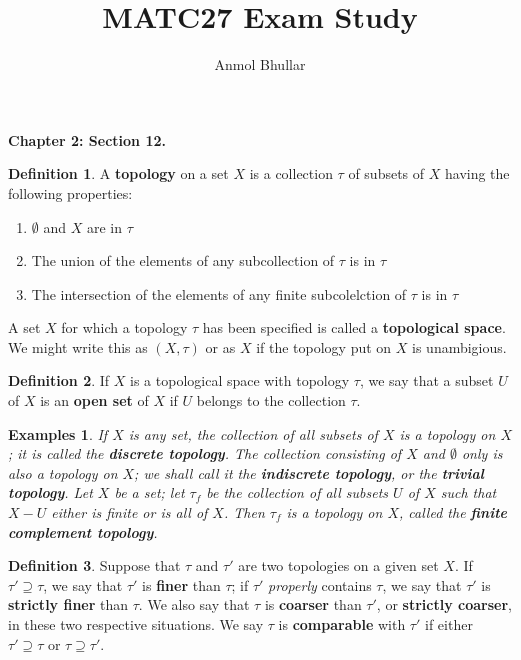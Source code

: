 \documentclass{article}
\title{MATC27 Exam Study}
\author{Anmol Bhullar}
\newtheorem{es}{Examples}
\theoremstyle{definition}
\newtheorem{definition}{Definition}[section]
\theoremstyle{remark}
\begin{document}
    \maketitle

    \textbf{Chapter 2: Section 12.}
    \begin{definition}
        A \textbf{topology} on a set $X$ is a collection $\tau$ of subsets of $X$ having the following properties:
        \begin{enumerate}
            \item $\emptyset$ and $X$ are in $\tau$
            \item The union of the elements of any subcollection of $\tau$ is in $\tau$
            \item The intersection of the elements of any finite subcolelction of $\tau$ is in $\tau$
        \end{enumerate}
        A set $X$ for which a topology $\tau$ has been specified is called a \textbf{topological space}. We might write this
        as $(X,\tau)$ or as $X$ if the topology put on $X$ is unambigious.
    \end{definition}

    \begin{definition}
        If $X$ is a topological space with topology $\tau$, we say that a subset $U$ of $X$ is an \textbf{open set} of $X$ if $U$
        belongs to the collection $\tau$.
    \end{definition}

    \begin{es}
        If $X$ is any set, the collection of \textit{all} subsets of $X$ is a topology on $X$; it is called the \textbf{discrete
            topology}. The collection consisting of $X$ and $\emptyset$ only is also a topology on $X$; we shall call it the
        \textbf{indiscrete topology}, or the \textbf{trivial topology}. Let $X$ be a set; let $\tau_f$ be the collection of all
        subsets $U$ of $X$ such that $X-U$ either is finite or is all of $X$. Then $\tau_f$ is a topology on $X$, called the
        \textbf{finite complement topology}.
    \end{es}
    
    \begin{definition}
        Suppose that $\tau$ and $\tau'$ are two topologies on a given set $X$. If $\tau'\supseteq\tau$, we say that $\tau'$ is
        \textbf{finer} than $\tau$; if $\tau'$ \textit{properly} contains $\tau$, we say that $\tau'$ is \textbf{strictly finer}
        than $\tau$. We also say that $\tau$ is \textbf{coarser} than $\tau'$, or \textbf{strictly coarser}, in these two respective
        situations. We say $\tau$ is \textbf{comparable} with $\tau'$ if either $\tau'\supseteq\tau$ or $\tau\supseteq\tau'$.
    \end{definition}
\end{document}
